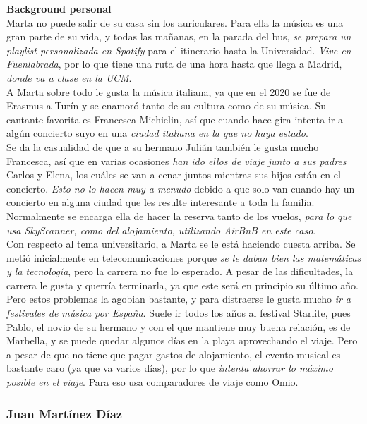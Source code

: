 \textbf{Background personal} \\

Marta no puede salir de su casa sin los auriculares. Para ella la música es una gran parte de su vida, y todas las mañanas, en la parada del bus, \textit{se prepara un playlist personalizada en Spotify} para el itinerario hasta la Universidad. \textit{Vive en Fuenlabrada}, por lo que tiene una ruta de una hora hasta que llega a Madrid, \textit{donde va a clase en la UCM}. \\ 

A Marta sobre todo le gusta la música italiana, ya que en el 2020 se fue de Erasmus a Turín y se enamoró tanto de su cultura como de su música. Su cantante favorita es Francesca Michielin, así que cuando hace gira intenta ir a algún concierto suyo en una \textit{ciudad italiana en la que no haya estado}. \\

Se da la casualidad de que a su hermano Julián también le gusta mucho Francesca, así que en varias ocasiones \textit{han ido ellos de viaje junto a sus padres} Carlos y Elena, los cuáles se van a cenar juntos mientras sus hijos están en el concierto. \textit{Esto no lo hacen muy a menudo} debido a que solo van cuando hay un concierto en alguna ciudad que les resulte interesante a toda la familia. Normalmente se encarga ella de hacer la reserva tanto de los vuelos, \textit{para lo que usa SkyScanner, como del alojamiento, utilizando AirBnB en este caso}. \\

Con respecto al tema universitario, a Marta se le está haciendo cuesta arriba. Se metió inicialmente en telecomunicaciones porque \textit{se le daban bien las matemáticas y la tecnología}, pero la carrera no fue lo esperado. A pesar de las dificultades, la carrera le gusta y querría terminarla, ya que este será en principio su último año. Pero estos problemas la agobian bastante, y para distraerse le gusta mucho \textit{ir a festivales de música por España}. Suele ir todos los años al festival Starlite, pues Pablo, el novio de su hermano y con el que mantiene muy buena relación, es de Marbella, y se puede quedar algunos días en la playa aprovechando el viaje. Pero a pesar de que no tiene que pagar gastos de alojamiento, el evento musical es bastante caro (ya que va varios días), por lo que \textit{intenta ahorrar lo máximo posible en el viaje}. Para eso usa comparadores de viaje como Omio.

\subsubsection{Juan Martínez Díaz}

